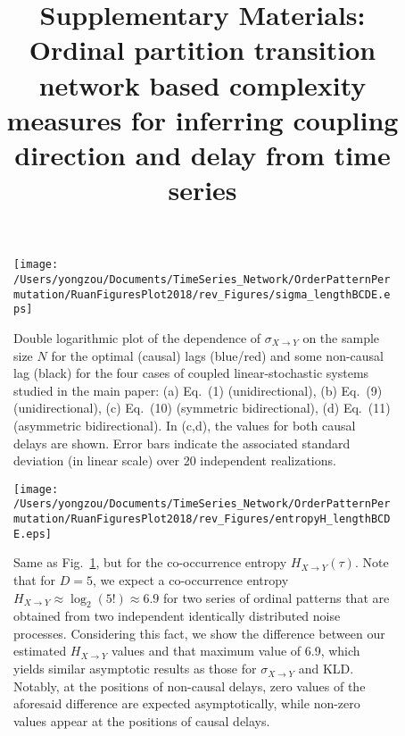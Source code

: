 \documentclass[aps,pre,superscriptaddress,floats,11pt]{revtex4}
\begin{document}
\title{Supplementary Materials: \\ Ordinal partition transition network based complexity measures for inferring coupling direction and delay from time series}


\maketitle

\renewcommand{\thepage}{SM-\arabic{page}}  
\renewcommand{\thesection}{SM-\Roman{section}}   
\renewcommand{\theequation}{S\arabic{equation}}  
\renewcommand{\thetable}{S\arabic{table}}   
\renewcommand{\thefigure}{S\arabic{figure}}

\begin{figure}[htb]
	\centering
	\texttt{[image: /Users/yongzou/Documents/TimeSeries\_Network/OrderPatternPermutation/RuanFiguresPlot2018/rev\_Figures/sigma\_lengthBCDE.eps]}
\caption{Double logarithmic plot of the dependence of $\sigma_{X\to Y}$ on the sample size $N$ for the optimal (causal) lags (blue/red) and some non-causal lag (black) for the four cases of coupled linear-stochastic systems studied in the main paper: (a) Eq.~(1) (unidirectional), (b) Eq.~(9) (unidirectional), (c) Eq.~(10) (symmetric bidirectional), (d) Eq.~(11) (asymmetric bidirectional). In (c,d), the values for both causal delays are shown. Error bars indicate the associated standard deviation (in linear scale) over 20 independent realizations.  \label{fig:sampleSizeBCDEsigma}}
\end{figure}

\begin{figure}[htb]
	\centering
	\texttt{[image: /Users/yongzou/Documents/TimeSeries\_Network/OrderPatternPermutation/RuanFiguresPlot2018/rev\_Figures/entropyH\_lengthBCDE.eps]}
\caption{Same as Fig.~\ref{fig:sampleSizeBCDEsigma}, but for the co-occurrence entropy $H_{X\to Y}(\tau)$. Note that for $D=5$, we expect a co-occurrence entropy $H_{X \to Y} \approx \log_2 (5!) \approx 6.9$ for two series of ordinal patterns that are obtained from two independent identically distributed noise processes. Considering this fact, we show the difference between our estimated $H_{X \to Y}$ values and that maximum value of 6.9, which yields similar asymptotic results as those for $\sigma_{X\to Y}$ and KLD. Notably, at the positions of non-causal delays, zero values of the aforesaid difference are expected asymptotically, while non-zero values appear at the positions of causal delays. \label{fig:sampleSizeBCDEentropy}}
\end{figure}
\end{document}
